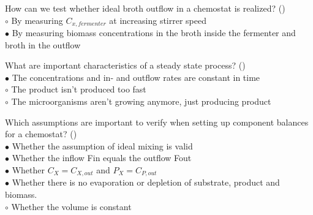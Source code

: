 \documentclass[]{beamer}
\begin{document}
\begin{frame}[shrink] {}
\addtocounter{answers}{1}
\color{blue}
How can we test whether ideal broth outflow in a chemostat is realized? ()\\
\color{black}
\setlength{\parindent}{-0.4cm}
{\color{red}$\circ$}  By measuring $C_{x,fermenter}$ at increasing stirrer speed\\
{\color{red}$\bullet$} By measuring biomass concentrations in the broth inside the fermenter and broth in the outflow \\
\end{frame}

\begin{frame}[shrink] {}
\addtocounter{answers}{1}
\color{blue}
 What are important characteristics of a steady state process? ()\\
\color{black}
\setlength{\parindent}{-0.4cm}
{\color{red}$\bullet$}   The concentrations and in- and outflow rates are constant in time \\
{\color{red}$\circ$} The product isn’t produced too fast\\
{\color{red}$\circ$} The microorganisms aren’t growing anymore, just producing product \\
\end{frame}

\begin{frame}[shrink] {}
\addtocounter{answers}{1}
\color{blue}
Which assumptions are important to verify when setting up component balances for a chemostat? ()\\
\color{black}
\setlength{\parindent}{-0.4cm}
{\color{red}$\bullet$} Whether the assumption of ideal mixing is valid\\
{\color{red}$\bullet$} Whether the inflow Fin equals the outflow Fout\\
{\color{red}$\bullet$} Whether $C_X = C_{X,out}$ and $P_X = C_{P,out}$ \\
{\color{red}$\bullet$} Whether there is no evaporation or depletion of substrate, product and biomass.\\
{\color{red}$\circ$} Whether the volume is constant  \\
\end{frame}
\end{document}

